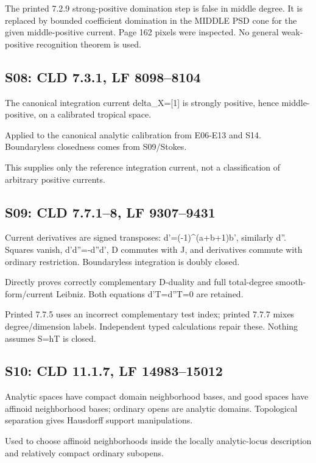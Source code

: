 \documentclass[11pt]{article}
\begin{document}
The printed 7.2.9 strong-positive domination step is false in middle degree. It is replaced by bounded coefficient domination in the MIDDLE PSD cone for the given middle-positive current. Page 162 pixels were inspected. No general weak-positive recognition theorem is used.

\subsection*{S08: CLD 7.3.1, LF 8098--8104}

The canonical integration current delta\_X=[1] is strongly positive, hence middle-positive, on a calibrated tropical space.

Applied to the canonical analytic calibration from E06-E13 and S14. Boundaryless closedness comes from S09/Stokes.

This supplies only the reference integration current, not a classification of arbitrary positive currents.

\subsection*{S09: CLD 7.7.1--8, LF 9307--9431}

Current derivatives are signed transposes: d'=(-1)\textasciicircum{}(a+b+1)b', similarly d''. Squares vanish, d'd''=-d''d', D commutes with J, and derivatives commute with ordinary restriction. Boundaryless integration is doubly closed.

Directly proves correctly complementary D-duality and full total-degree smooth-form/current Leibniz. Both equations d'T=d''T=0 are retained.

Printed 7.7.5 uses an incorrect complementary test index; printed 7.7.7 mixes degree/dimension labels. Independent typed calculations repair these. Nothing assumes S=hT is closed.

\subsection*{S10: CLD 11.1.7, LF 14983--15012}

Analytic spaces have compact domain neighborhood bases, and good spaces have affinoid neighborhood bases; ordinary opens are analytic domains. Topological separation gives Hausdorff support manipulations.

Used to choose affinoid neighborhoods inside the locally analytic-locus description and relatively compact ordinary subopens.
\end{document}
